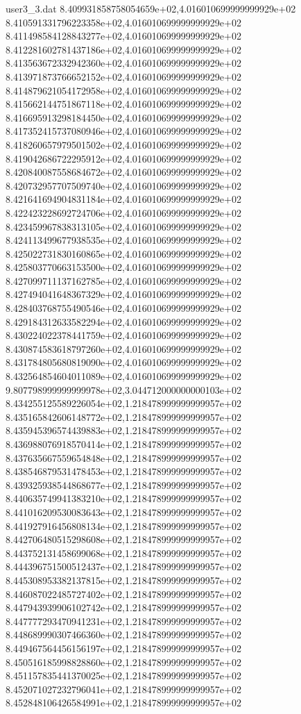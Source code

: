 \begin{filecontents}{user3_3.dat}
8.409931858758054659e+02,4.016010699999999929e+02
8.410591331796223358e+02,4.016010699999999929e+02
8.411498584128843277e+02,4.016010699999999929e+02
8.412281602781437186e+02,4.016010699999999929e+02
8.413563672332942360e+02,4.016010699999999929e+02
8.413971873766652152e+02,4.016010699999999929e+02
8.414879621054172958e+02,4.016010699999999929e+02
8.415662144751867118e+02,4.016010699999999929e+02
8.416695913298184450e+02,4.016010699999999929e+02
8.417352415737080946e+02,4.016010699999999929e+02
8.418260657979501502e+02,4.016010699999999929e+02
8.419042686722295912e+02,4.016010699999999929e+02
8.420840087558684672e+02,4.016010699999999929e+02
8.420732957707509740e+02,4.016010699999999929e+02
8.421641694904831184e+02,4.016010699999999929e+02
8.422423228692724706e+02,4.016010699999999929e+02
8.423459967838313105e+02,4.016010699999999929e+02
8.424113499677938535e+02,4.016010699999999929e+02
8.425022731830160865e+02,4.016010699999999929e+02
8.425803770663153500e+02,4.016010699999999929e+02
8.427099711137162785e+02,4.016010699999999929e+02
8.427494041648367329e+02,4.016010699999999929e+02
8.428403768755490546e+02,4.016010699999999929e+02
8.429184312633582294e+02,4.016010699999999929e+02
8.430224022378441759e+02,4.016010699999999929e+02
8.430874583618797260e+02,4.016010699999999929e+02
8.431784805680819090e+02,4.016010699999999929e+02
8.432564854604011089e+02,4.016010699999999929e+02
9.807798999999999978e+02,3.044712000000000103e+02
8.434255125589226054e+02,1.218478999999999957e+02
8.435165842606148772e+02,1.218478999999999957e+02
8.435945396574439883e+02,1.218478999999999957e+02
8.436988076918570414e+02,1.218478999999999957e+02
8.437635667559654848e+02,1.218478999999999957e+02
8.438546879531478453e+02,1.218478999999999957e+02
8.439325938544868677e+02,1.218478999999999957e+02
8.440635749941383210e+02,1.218478999999999957e+02
8.441016209530083643e+02,1.218478999999999957e+02
8.441927916456808134e+02,1.218478999999999957e+02
8.442706480515298608e+02,1.218478999999999957e+02
8.443752131458699068e+02,1.218478999999999957e+02
8.444396751500512437e+02,1.218478999999999957e+02
8.445308953382137815e+02,1.218478999999999957e+02
8.446087022485727402e+02,1.218478999999999957e+02
8.447943939906102742e+02,1.218478999999999957e+02
8.447777293470941231e+02,1.218478999999999957e+02
8.448689990307466360e+02,1.218478999999999957e+02
8.449467564456156197e+02,1.218478999999999957e+02
8.450516185998828860e+02,1.218478999999999957e+02
8.451157835441370025e+02,1.218478999999999957e+02
8.452071027232796041e+02,1.218478999999999957e+02
8.452848106426584991e+02,1.218478999999999957e+02

\end{filecontents}
